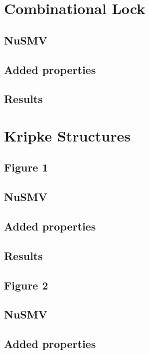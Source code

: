 \documentclass[11pt]{article}
\begin{document}


\section{Combinational Lock}
	\subsection{NuSMV}
	\subsection{Added properties}
	\subsection{Results}


\section{Kripke Structures} 

\subsection{Figure 1}
	\subsection{NuSMV}
	\subsection{Added properties}
	\subsection{Results}
\subsection{Figure 2}
	\subsection{NuSMV}
	\subsection{Added properties}
\end{document}
